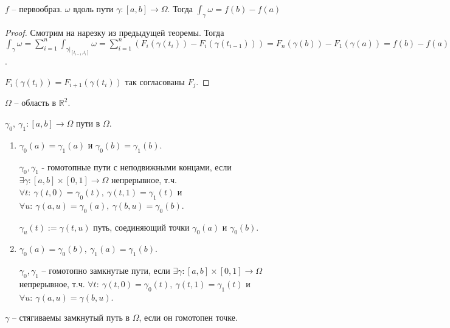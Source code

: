 \begin{consequence}
    $f$ -- первообраз. $\omega$ вдоль пути $\gamma: [a, b] \rightarrow \Omega$. Тогда $\int_{\gamma} {\omega} = f(b) - f(a)$
\end{consequence}
\begin{proof}
    Смотрим на нарезку из предыдущей теоремы. Тогда $\int_{\gamma} {\omega} = \sum_{i=1}^{n} { \int_{\gamma|_{[t_{i - 1}, t_i]}} {\omega}} = \sum_{i=1}^{n} { \left( F_i(\gamma(t_i)) - F_{i}(\gamma(t_{i - 1})) \right) } = F_n(\gamma(b)) - F_1(\gamma(a)) = f(b) - f(a)$.

    $F_i(\gamma(t_i)) = F_{i + 1} (\gamma(t_i))$ так согласованы $F_j$.
\end{proof}

\begin{definition}
    $\Omega$ -- область в $\mathbb{R}^2$.

    $\gamma_0, \ \gamma_1: [a, b] \rightarrow \Omega$ пути в $\Omega$.

    \begin{enumerate}
        \item {
            $\gamma_0(a) = \gamma_1(a)$ и $\gamma_0(b) = \gamma_1(b)$.

            $\gamma_0, \gamma_1$ - гомотопные пути с неподвижными концами, если $\exists \gamma: [a, b] \times [0, 1] \rightarrow \Omega$ непрерывное, т.ч. $\forall t: \ \gamma(t, 0) = \gamma_0(t), \ \gamma(t, 1) = \gamma_1(t)$ и $\forall u: \ \gamma(a, u) = \gamma_0(a), \ \gamma(b, u) = \gamma_0(b)$.
            
            $\gamma_u (t) := \gamma(t, u)$ путь, соединяющий точки $\gamma_0(a)$ и $\gamma_0(b)$.

        }
        \item {
            $\gamma_0(a) = \gamma_0(b), \ \gamma_1(a) = \gamma_1(b)$.

            $\gamma_0, \gamma_1$ -- гомотопно замкнутые пути, если $\exists \gamma: [a, b] \times [0, 1] \rightarrow \Omega$ непрерывное, т.ч. $\forall t : \ \gamma(t, 0) = \gamma_0(t), \ \gamma(t, 1) = \gamma_1(t)$ и $\forall u: \ \gamma(a, u) = \gamma(b, u)$.

        }
    \end{enumerate}
\end{definition}
\begin{definition}
    $\gamma$ -- стягиваемы замкнутый путь в $\Omega$, если он гомотопен точке.
\end{definition}
